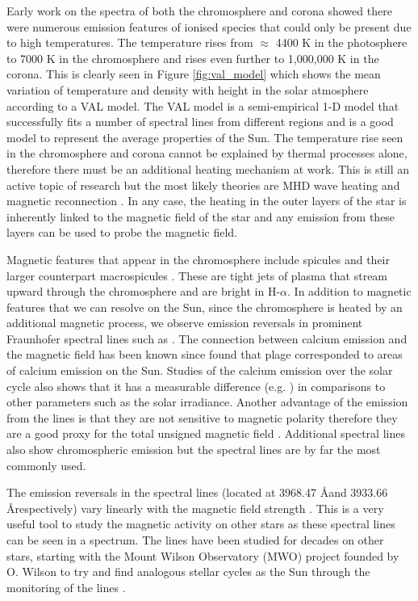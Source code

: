 Early work on the spectra of both the chromosphere and corona showed there were numerous emission features of ionised species that could only be present due to high temperatures. The temperature rises from $\approx$ 4400 K in the photosphere to 7000 K in the chromosphere and rises even further to 1,000,000 K in the corona. This is clearly seen in Figure \ref{fig:val_model} which shows the mean variation of temperature and density with height in the solar atmosphere according to a VAL model. The VAL model \citep{Vernazza_etal_1981} is a semi-empirical 1-D model that successfully fits a number of spectral lines from different regions and is a good model to represent the average properties of the Sun. The temperature rise seen in the chromosphere and corona cannot be explained by thermal processes alone, therefore there must be an additional heating mechanism at work. This is still an active topic of research but the most likely theories are MHD wave heating and magnetic reconnection \citep{Parnell_DeMoortel_2012}. In any case, the heating in the outer layers of the star is inherently linked to the magnetic field of the star and any emission from these layers can be used to probe the magnetic field. 

Magnetic features that appear in the chromosphere include spicules \citep{Roberts_1945} and their larger counterpart macrospicules \citep{Bohlin_etal_1975}. These are tight jets of plasma that stream upward through the chromosphere and are bright in H-$\alpha$. In addition to magnetic features that we can resolve on the Sun, since the chromosphere is heated by an additional magnetic process, we observe emission reversals in prominent Fraunhofer spectral lines such as \caII. The connection between calcium emission and the magnetic field has been known since \citet{Leighton_1959} found that plage corresponded to areas of calcium emission on the Sun. Studies of the calcium emission over the solar cycle also shows that it has a measurable difference (e.g. \citealt{White_Livingston_1981}) in comparisons to other parameters such as the solar irradiance. Another advantage of the emission from the \caII lines is that they are not sensitive to magnetic polarity therefore they are a good proxy for the total unsigned magnetic field \citep{Linsky_Avrett_1970}. Additional spectral lines also show chromospheric emission but the \caII spectral lines are by far the most commonly used.

The emission reversals in the \caII spectral lines (located at 3968.47 \AA \space and 3933.66 \AA \space respectively) vary linearly with the magnetic field strength \citep{Frazier_1970}. This is a very useful tool to study the magnetic activity on other stars as these spectral lines can be seen in a spectrum. The \caII lines have been studied for decades on other stars, starting with the Mount Wilson Observatory (MWO) project founded by O. Wilson to try and find analogous stellar cycles as the Sun through the monitoring of the \caII lines \citep{Wilson_1968}.

